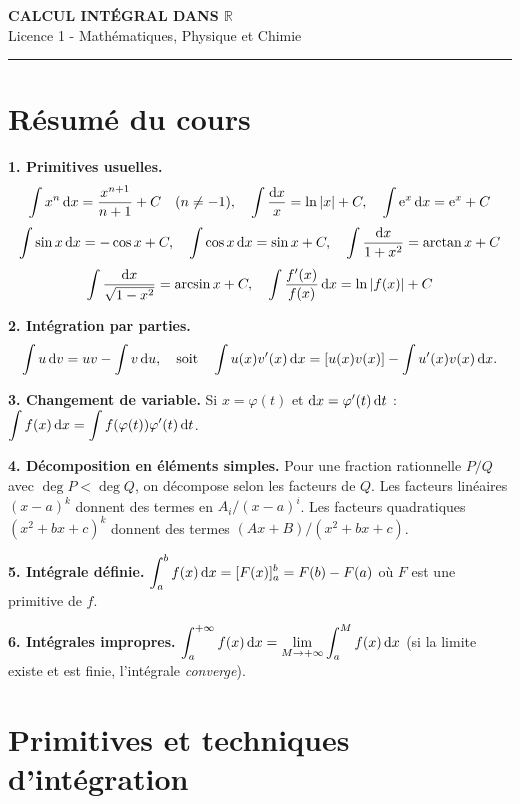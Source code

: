 \documentclass[12pt,a4paper]{article}
\begin{document}
\fi

\begin{center}
  {\LARGE\bfseries CALCUL INTÉGRAL DANS $\mathbb{R}$}\\[0.3cm]
  {\normalsize Licence 1 - Mathématiques, Physique et Chimie}\\[0.1cm]
  \rule{0.7\textwidth}{0.8pt}
\end{center}

\section*{Résumé du cours}

\begin{boiteresume}

\textbf{1. Primitives usuelles.}
\[
\int x^n\,\mathrm{d} x = \frac{x^{n+1}}{n+1}+C \quad (n\neq-1), \quad \int \frac{\mathrm{d} x}{x}=\ln|x|+C, \quad \int\mathrm{e}^x\,\mathrm{d} x=\mathrm{e}^x+C
\]
\[
\int\sin x\,\mathrm{d} x = -\cos x+C, \quad \int\cos x\,\mathrm{d} x=\sin x+C, \quad \int\frac{\mathrm{d} x}{1+x^2}=\arctan x+C
\]
\[
\int\frac{\mathrm{d} x}{\sqrt{1-x^2}}=\arcsin x+C, \quad \int\frac{f'(x)}{f(x)}\,\mathrm{d} x=\ln|f(x)|+C
\]

\textbf{2. Intégration par parties.}
\[
\int u\,\mathrm{d} v = uv - \int v\,\mathrm{d} u, \quad \text{soit} \quad \int u(x)v'(x)\,\mathrm{d} x = [u(x)v(x)] - \int u'(x)v(x)\,\mathrm{d} x.
\]

\textbf{3. Changement de variable.} Si $x=\varphi(t)$ et $\mathrm{d} x=\varphi'(t)\,\mathrm{d} t$ :
$\displaystyle\int f(x)\,\mathrm{d} x = \int f(\varphi(t))\varphi'(t)\,\mathrm{d} t$.

\textbf{4. Décomposition en éléments simples.} Pour une fraction rationnelle $P/Q$ avec $\deg P < \deg Q$, on décompose selon les facteurs de $Q$. Les facteurs linéaires $(x-a)^k$ donnent des termes en $A_i/(x-a)^i$. Les facteurs quadratiques $(x^2+bx+c)^k$ donnent des termes $(Ax+B)/(x^2+bx+c)$.

\textbf{5. Intégrale définie.} $\displaystyle\int_a^b f(x)\,\mathrm{d} x = [F(x)]_a^b = F(b)-F(a)$ où $F$ est une primitive de $f$.

\textbf{6. Intégrales impropres.} $\displaystyle\int_a^{+\infty} f(x)\,\mathrm{d} x = \lim_{M\to+\infty}\int_a^M f(x)\,\mathrm{d} x$ (si la limite existe et est finie, l'intégrale \textit{converge}).

\end{boiteresume}

\newpage
\section{Primitives et techniques d'intégration}
\end{document}

